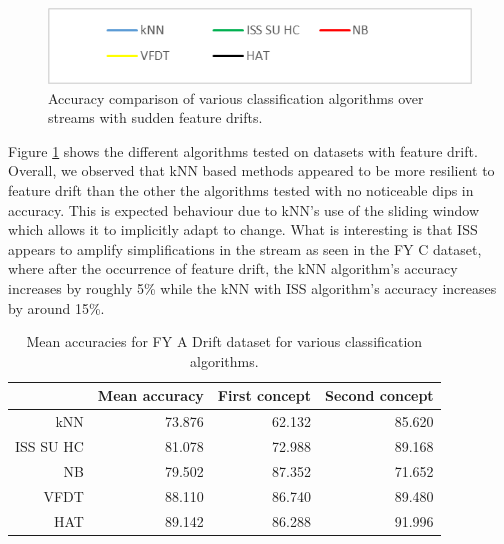 \begin{figure}[h]
\includegraphics[scale=0.5]{Graphs/legendCompareFD}
\caption{Accuracy comparison of various classification algorithms over streams with sudden feature drifts.}
\label{fig:FeatureDrift}
\end{figure}

Figure \ref{fig:FeatureDrift} shows the different algorithms tested on datasets with feature drift. Overall, we observed that kNN based methods appeared to be more resilient to feature drift than the other the algorithms tested with no noticeable dips in accuracy. This is expected behaviour due to kNN's use of the sliding window which allows it to implicitly adapt to change. What is interesting is that ISS appears to amplify simplifications in the stream as seen in the FY C dataset, where after the occurrence of feature drift, the kNN algorithm's accuracy increases by roughly 5\% while the kNN with ISS algorithm's accuracy increases by around 15\%.


\begin{table}[h]
\centering
\begin{tabular}{r|rrr}
          & Mean accuracy & First concept & Second concept \\  \hline
kNN       & 73.876        & 62.132                      & 85.620                       \\
ISS SU HC & 81.078        & 72.988                      & 89.168                       \\
NB        & 79.502        & 87.352                      & 71.652                       \\
VFDT      & 88.110        & 86.740                      & 89.480                       \\
HAT       & 89.142        & 86.288                      & 91.996                      
\end{tabular}
\caption{Mean accuracies for FY A Drift dataset for various classification algorithms.}
\label{Table:Feature_Drift_FY_A_Drift}
\end{table}


